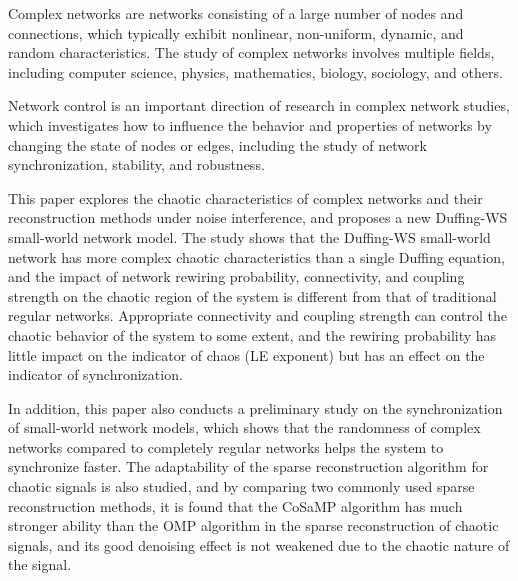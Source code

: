 Complex networks are networks consisting of a large number of nodes and connections, which typically exhibit nonlinear, non-uniform, dynamic, and random characteristics. The study of complex networks involves multiple fields, including computer science, physics, mathematics, biology, sociology, and others.

Network control is an important direction of research in complex network studies, which investigates how to influence the behavior and properties of networks by changing the state of nodes or edges, including the study of network synchronization, stability, and robustness.

This paper explores the chaotic characteristics of complex networks and their reconstruction methods under noise interference, and proposes a new Duffing-WS small-world network model. 
The study shows that the Duffing-WS small-world network has more complex chaotic characteristics than a single Duffing equation, and the impact of network rewiring probability, connectivity, and coupling strength on the chaotic region of the system is different from that of traditional regular networks. Appropriate connectivity and coupling strength can control the chaotic behavior of the system to some extent, and the rewiring probability has little impact on the indicator of chaos (LE exponent) but has an effect on the indicator of synchronization.

In addition, this paper also conducts a preliminary study on the synchronization of small-world network models, which shows that the randomness of complex networks compared to completely regular networks helps the system to synchronize faster. The adaptability of the sparse reconstruction algorithm for chaotic signals is also studied, and by comparing two commonly used sparse reconstruction methods, it is found that the CoSaMP algorithm has much stronger ability than the OMP algorithm in the sparse reconstruction of chaotic signals, and its good denoising effect is not weakened due to the chaotic nature of the signal.

